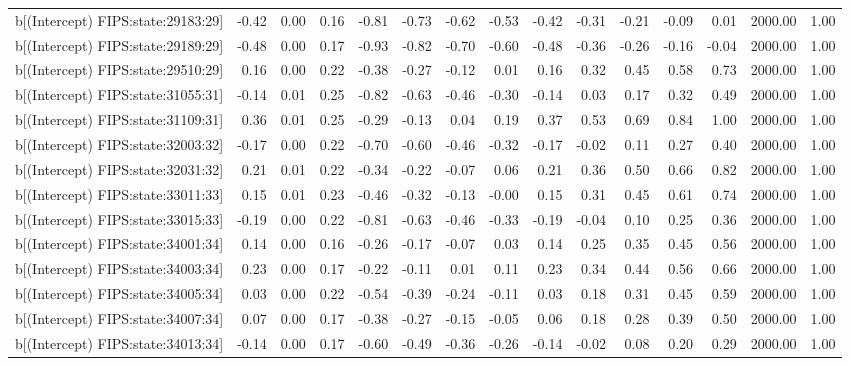\begin{table}[ht]
\begin{tabular}{rrrrrrrrrrrrrrr}
  b[(Intercept) FIPS:state:29183:29] & -0.42 & 0.00 & 0.16 & -0.81 & -0.73 & -0.62 & -0.53 & -0.42 & -0.31 & -0.21 & -0.09 & 0.01 & 2000.00 & 1.00 \\ 
  b[(Intercept) FIPS:state:29189:29] & -0.48 & 0.00 & 0.17 & -0.93 & -0.82 & -0.70 & -0.60 & -0.48 & -0.36 & -0.26 & -0.16 & -0.04 & 2000.00 & 1.00 \\ 
  b[(Intercept) FIPS:state:29510:29] & 0.16 & 0.00 & 0.22 & -0.38 & -0.27 & -0.12 & 0.01 & 0.16 & 0.32 & 0.45 & 0.58 & 0.73 & 2000.00 & 1.00 \\ 
  b[(Intercept) FIPS:state:31055:31] & -0.14 & 0.01 & 0.25 & -0.82 & -0.63 & -0.46 & -0.30 & -0.14 & 0.03 & 0.17 & 0.32 & 0.49 & 2000.00 & 1.00 \\ 
  b[(Intercept) FIPS:state:31109:31] & 0.36 & 0.01 & 0.25 & -0.29 & -0.13 & 0.04 & 0.19 & 0.37 & 0.53 & 0.69 & 0.84 & 1.00 & 2000.00 & 1.00 \\ 
  b[(Intercept) FIPS:state:32003:32] & -0.17 & 0.00 & 0.22 & -0.70 & -0.60 & -0.46 & -0.32 & -0.17 & -0.02 & 0.11 & 0.27 & 0.40 & 2000.00 & 1.00 \\ 
  b[(Intercept) FIPS:state:32031:32] & 0.21 & 0.01 & 0.22 & -0.34 & -0.22 & -0.07 & 0.06 & 0.21 & 0.36 & 0.50 & 0.66 & 0.82 & 2000.00 & 1.00 \\ 
  b[(Intercept) FIPS:state:33011:33] & 0.15 & 0.01 & 0.23 & -0.46 & -0.32 & -0.13 & -0.00 & 0.15 & 0.31 & 0.45 & 0.61 & 0.74 & 2000.00 & 1.00 \\ 
  b[(Intercept) FIPS:state:33015:33] & -0.19 & 0.00 & 0.22 & -0.81 & -0.63 & -0.46 & -0.33 & -0.19 & -0.04 & 0.10 & 0.25 & 0.36 & 2000.00 & 1.00 \\ 
  b[(Intercept) FIPS:state:34001:34] & 0.14 & 0.00 & 0.16 & -0.26 & -0.17 & -0.07 & 0.03 & 0.14 & 0.25 & 0.35 & 0.45 & 0.56 & 2000.00 & 1.00 \\ 
  b[(Intercept) FIPS:state:34003:34] & 0.23 & 0.00 & 0.17 & -0.22 & -0.11 & 0.01 & 0.11 & 0.23 & 0.34 & 0.44 & 0.56 & 0.66 & 2000.00 & 1.00 \\ 
  b[(Intercept) FIPS:state:34005:34] & 0.03 & 0.00 & 0.22 & -0.54 & -0.39 & -0.24 & -0.11 & 0.03 & 0.18 & 0.31 & 0.45 & 0.59 & 2000.00 & 1.00 \\ 
  b[(Intercept) FIPS:state:34007:34] & 0.07 & 0.00 & 0.17 & -0.38 & -0.27 & -0.15 & -0.05 & 0.06 & 0.18 & 0.28 & 0.39 & 0.50 & 2000.00 & 1.00 \\ 
  b[(Intercept) FIPS:state:34013:34] & -0.14 & 0.00 & 0.17 & -0.60 & -0.49 & -0.36 & -0.26 & -0.14 & -0.02 & 0.08 & 0.20 & 0.29 & 2000.00 & 1.00 \\ 

\end{tabular}
\end{table}
